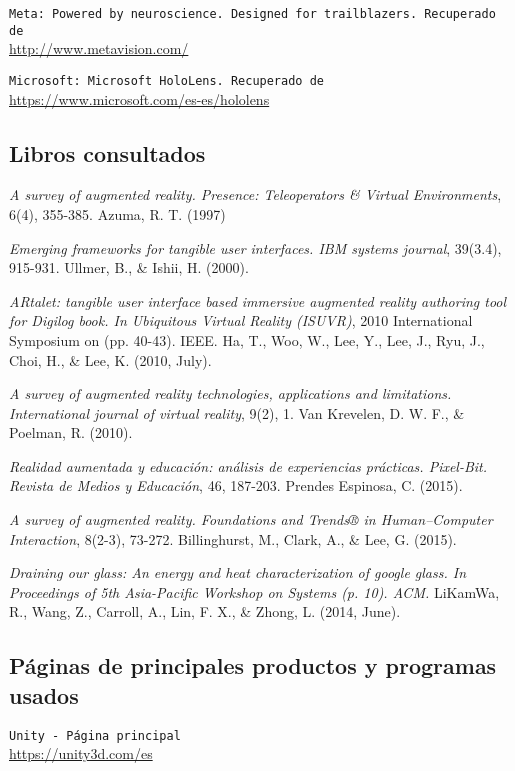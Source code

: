 {\tt Meta: Powered by neuroscience. Designed for trailblazers. Recuperado de }\\
\url{http://www.metavision.com/}

{\tt Microsoft: Microsoft HoloLens. Recuperado de }\\
\url{https://www.microsoft.com/es-es/hololens}


\subsection*{Libros consultados}

{\em A survey of augmented reality. Presence: Teleoperators & Virtual Environments}, 6(4), 355-385. Azuma, R. T. (1997)

{\em Emerging frameworks for tangible user interfaces. IBM systems journal}, 39(3.4), 915-931. Ullmer, B., & Ishii, H. (2000).

{\em ARtalet: tangible user interface based immersive augmented reality authoring tool for Digilog book. In Ubiquitous Virtual Reality (ISUVR)}, 2010 International Symposium on (pp. 40-43). IEEE. Ha, T., Woo, W., Lee, Y., Lee, J., Ryu, J., Choi, H., & Lee, K. (2010, July).

{\em A survey of augmented reality technologies, applications and limitations. International journal of virtual reality},  9(2), 1. Van Krevelen, D. W. F., & Poelman, R. (2010).

{\em Realidad aumentada y educación: análisis de experiencias prácticas. Pixel-Bit. Revista de Medios y Educación}, 46, 187-203. Prendes Espinosa, C. (2015).

{\em A survey of augmented reality. Foundations and Trends® in Human–Computer Interaction}, 8(2-3), 73-272. Billinghurst, M., Clark, A., & Lee, G. (2015).

{\em Draining our glass: An energy and heat characterization of google glass. In Proceedings of 5th Asia-Pacific Workshop on Systems (p. 10). ACM.} LiKamWa, R., Wang, Z., Carroll, A., Lin, F. X., & Zhong, L. (2014, June).


\subsection*{Páginas de principales productos y programas usados}

 {\tt Unity - Página principal}\\
\url{https://unity3d.com/es}

